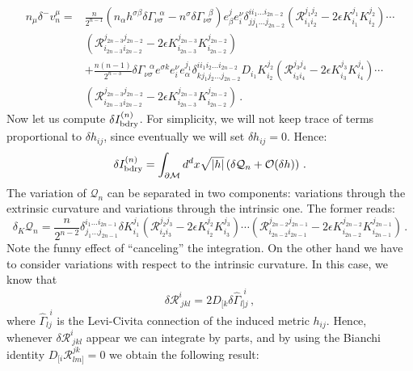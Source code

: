 \documentclass[11pt,letterpaper]{article}
\newcommand{\dslash}{\delta^{\!\!\!\!-}\!}
\begin{document}
\begin{equation}
\begin{aligned}
n_{\mu}\dslash v_n^{\mu}=&\frac{n}{2^{n-1}}\left(n_{\alpha}h^{\sigma\beta}\delta \Gamma_{\nu\sigma}^{\ \ \ \alpha}-n^{\sigma}\delta \Gamma_{\nu\sigma}^{\ \ \ \beta}\right)e_{\beta}^{j}e^{\nu}_{i}\delta^{i i_1\dots i_{2n-2}}_{j j_1\dots j_{2n-2}}\left(\mathcal{R}^{j_1 j_2}_{i_1i_2}-2\epsilon K^{j_1}_{i_1}K^{j_2}_{i_2}\right)\cdots \\ &\left(\mathcal{R}^{j_{2n-3}j_{2n-2}}_{i_{2n-3}i_{2n-2}}-2\epsilon K^{j_{2n-3}}_{i_{2n-3}}K^{j_{2n-2}}_{i_{2n-2}}\right)\\
&+\frac{n(n-1)}{2^{n-3}}\delta \Gamma_{\nu\sigma}^{\ \ \ \alpha}e^{\sigma k} e^{\nu}_{i}e_{\alpha}^{j_1}\delta^{i i_1 i_2\dots i_{2n-2}}_{k j_1 j_2\dots j_{2n-2}}D_{i_1}K_{i_2}^{j_2}\left(\mathcal{R}^{j_3 j_4}_{i_3i_4}-2\epsilon K^{j_3}_{i_3}K^{j_4}_{i_4}\right)\cdots \\
&\left(\mathcal{R}^{j_{2n-3}j_{2n-2}}_{i_{2n-3}i_{2n-2}}-2\epsilon K^{j_{2n-3}}_{i_{2n-3}}K^{j_{2n-2}}_{i_{2n-2}}\right)\, .
\end{aligned}
\end{equation}
Now let us compute $\delta I_{\rm bdry}^{(n)}$. For simplicity, we will not keep trace of terms proportional to $\delta h_{ij}$, since eventually we will set $\delta h_{ij}=0$.  Hence:
\begin{equation}
 \delta I_{\rm bdry}^{(n)}= \int_{\partial \mathcal{M}}d^{d}x\sqrt{|h|}\left(\delta \mathcal{Q}_{n}+\mathcal{O}(\delta h)\right)\, .
\end{equation}
The variation of $\mathcal{Q}_n$ can be separated in two components: variations through the extrinsic curvature and variations through the intrinsic one. The former reads:
\begin{equation}
\delta_{K}\mathcal{Q}_n=\frac{n}{2^{n-2}}\delta^{i_1\dots i_{2n-1}}_{j_1\dots j_{2n-1}}\delta K^{j_1}_{i_1}\left(\mathcal{R}^{j_2 j_3}_{i_2i_3}-2\epsilon K^{j_2}_{i_2}K^{j_3}_{i_3}\right)\cdots \left(\mathcal{R}^{j_{2n-2}j_{2n-1}}_{i_{2n-2}i_{2n-1}}-2\epsilon K^{j_{2n-2}}_{i_{2n-2}}K^{j_{2n-1}}_{i_{2n-1}}\right)\, .
\end{equation}
Note the funny effect of ``canceling'' the integration. On the other hand we have to consider variations with respect to the intrinsic curvature. In this case, we know that
\begin{equation}
\delta \mathcal{R}^{i}_{\  jkl}=2 D_{[k}\delta \hat\Gamma_{l]j}^{\ \ i}\, ,
\end{equation}
where $ \hat\Gamma_{lj}^{\ \ i}$ is the Levi-Civita connection of the induced metric $h_{ij}$. Hence, whenever $\delta \mathcal{R}^{i}_{\  jkl}$ appear we can integrate by parts, and by using the Bianchi identity $D_{[i}\mathcal{R}^{jk}_{lm]}=0$ we obtain the following result:
\end{document}
